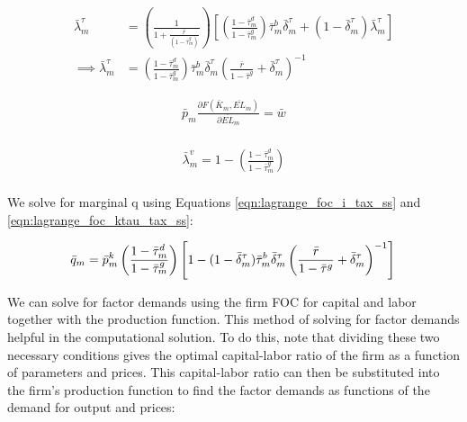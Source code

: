 \documentclass[letterpaper,12pt]{article}
\theoremstyle{definition}
\begin{document}
\begin{spacing}{1.5}
\begin{equation}
\label{eqn:lagrange_foc_ktau_tax_ss}
\begin{split}
\bar{\lambda}^{\tau}_{m} &=  \left(\frac{1}{1+\frac{\bar{r}}{(1-\bar{\tau}^{g}_{m})}}\right) \left[ \left(\frac{1-\bar{\tau}^{d}_{m}}{1-\bar{\tau}^{g}_{m}}\right)\bar{\tau}^{b}_{m}\bar{\delta}^{\tau}_{m} + (1-\bar{\delta}^{\tau}_{m})\bar{\lambda}^{\tau}_{m}\right]  \\
\implies \bar{\lambda}^{\tau}_{m} &=\left(\frac{1-\bar{\tau}^{d}_{m}}{1-\bar{\tau}^{g}_{m}}\right)\bar{\tau}^{b}_{m}\bar{\delta}^{\tau}_{m}\left(\frac{\bar{r}}{1-\bar{\tau}^{g}}+\bar{\delta}^{\tau}_{m}\right)^{-1}
\end{split}
\end{equation}

\begin{equation}
\label{eqn:lagrange_foc_l_tax_ss}
\begin{split}
  \bar{p}_{m}\frac{\partial F(\bar{K}_{m},\overline{EL}_{m})}{\partial \overline{EL}_{m}} = \bar{w}  \\
\end{split}
\end{equation}


\begin{equation}
\label{eqn:lagrange_foc_vn_tax2_ss}
\begin{split}
 \bar{\lambda}^{v}_{m} = 1 - \left(\frac{1-\bar{\tau}^{d}_{m}}{1-\bar{\tau}^{g}_{m}}\right)   \\
\end{split}
\end{equation}


We solve for marginal q using Equations \ref{eqn:lagrange_foc_i_tax_ss} and \ref{eqn:lagrange_foc_ktau_tax_ss}:

\begin{equation}
\label{eqn:q_tax_ss}
 \bar{q}_{m} = \bar{p}^{k}_{m}\left(\frac{1-\bar{\tau}^{d}_{m}}{1-\bar{\tau}^{g}_{m}}\right)\left[1 - (1-\bar{\delta}^{\tau}_{m})\bar{\tau}^{b}_{m}\bar{\delta}^{\tau}_{m}\left(\frac{\bar{r}}{1-\bar{\tau}^{g}}+\bar{\delta}^{\tau}_{m}\right)^{-1} \right]  \\
\end{equation}


We can solve for factor demands using the firm FOC for capital and labor together with the production function.  This method of solving for factor demands helpful in the computational solution.  To do this, note that dividing these two necessary conditions gives the optimal capital-labor ratio of the firm as a function of parameters and prices.  This capital-labor ratio can then be substituted into the firm's production function to find the factor demands as functions of the demand for output and prices: 


\end{spacing}
\end{document}

